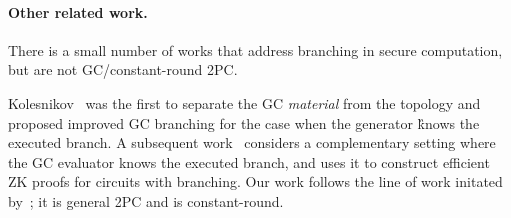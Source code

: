 \paragraph{Other related work.}

There is a small number of works that address branching in secure computation, but are not GC/constant-round 2PC.  

Kolesnikov~\cite{AC:Kolesnikov18} was the first to separate the GC {\em material} from the topology and proposed improved GC branching for the case when the generator \G knows the executed branch.  A subsequent work~\cite{EC:HeaKol20} considers a complementary setting where the GC evaluator \E knows the executed branch, and uses it to construct efficient ZK proofs for circuits with branching.
Our work follows the line of work initated by~\cite{AC:Kolesnikov18,EC:HeaKol20}; it is general 2PC and is constant-round.





